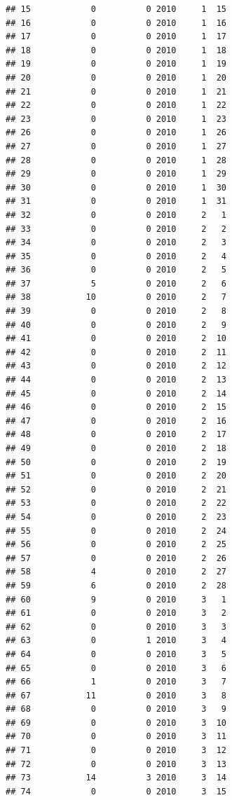\documentclass[
]{article}
\begin{document}
\begin{verbatim}
## 15            0          0 2010     1  15
## 16            0          0 2010     1  16
## 17            0          0 2010     1  17
## 18            0          0 2010     1  18
## 19            0          0 2010     1  19
## 20            0          0 2010     1  20
## 21            0          0 2010     1  21
## 22            0          0 2010     1  22
## 23            0          0 2010     1  23
## 26            0          0 2010     1  26
## 27            0          0 2010     1  27
## 28            0          0 2010     1  28
## 29            0          0 2010     1  29
## 30            0          0 2010     1  30
## 31            0          0 2010     1  31
## 32            0          0 2010     2   1
## 33            0          0 2010     2   2
## 34            0          0 2010     2   3
## 35            0          0 2010     2   4
## 36            0          0 2010     2   5
## 37            5          0 2010     2   6
## 38           10          0 2010     2   7
## 39            0          0 2010     2   8
## 40            0          0 2010     2   9
## 41            0          0 2010     2  10
## 42            0          0 2010     2  11
## 43            0          0 2010     2  12
## 44            0          0 2010     2  13
## 45            0          0 2010     2  14
## 46            0          0 2010     2  15
## 47            0          0 2010     2  16
## 48            0          0 2010     2  17
## 49            0          0 2010     2  18
## 50            0          0 2010     2  19
## 51            0          0 2010     2  20
## 52            0          0 2010     2  21
## 53            0          0 2010     2  22
## 54            0          0 2010     2  23
## 55            0          0 2010     2  24
## 56            0          0 2010     2  25
## 57            0          0 2010     2  26
## 58            4          0 2010     2  27
## 59            6          0 2010     2  28
## 60            9          0 2010     3   1
## 61            0          0 2010     3   2
## 62            0          0 2010     3   3
## 63            0          1 2010     3   4
## 64            0          0 2010     3   5
## 65            0          0 2010     3   6
## 66            1          0 2010     3   7
## 67           11          0 2010     3   8
## 68            0          0 2010     3   9
## 69            0          0 2010     3  10
## 70            0          0 2010     3  11
## 71            0          0 2010     3  12
## 72            0          0 2010     3  13
## 73           14          3 2010     3  14
## 74            0          0 2010     3  15

\end{verbatim}
\end{document}
